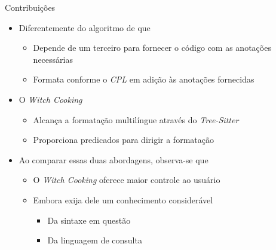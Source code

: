 \documentclass
  [ aspectratio=169,
    english,
    hyperref={citecolor=blue,colorlinks=true,linkcolor=blue,urlcolor=blue},
    brazil]
  {beamer}
\newcommand{\treesitter}{\textit{Tree-Sitter}\xspace}
\newcommand{\witchcooking}{\textit{Witch Cooking}\xspace}
\begin{document}
  \begin{frame}{Contribuições}
    \begin{itemize}
      \item Diferentemente do algoritmo de \textcite{oppen-1980-prettyprinting}
            que
            \begin{itemize}
              \item Depende de um terceiro para fornecer o código com as
                    anotações necessárias
              \item Formata conforme o \textit{CPL} em adição às anotações
                    fornecidas
            \end{itemize}
      \item O \witchcooking
            \begin{itemize}
              \item Alcança a formatação multilíngue através do \treesitter
              \item Proporciona predicados para dirigir a formatação
            \end{itemize}
      \item Ao comparar essas duas abordagens, observa-se que
            \begin{itemize}
              \item O \witchcooking oferece maior controle ao usuário
              \item Embora exija dele um conhecimento considerável
                    \begin{itemize}
                      \item Da sintaxe em questão
                      \item Da linguagem de consulta
                    \end{itemize}
            \end{itemize}
    \end{itemize}
  \end{frame}
\end{document}
